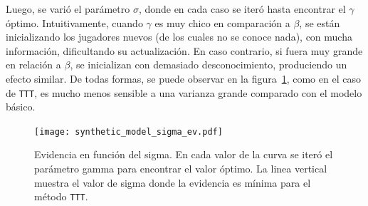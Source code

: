 \documentclass[11pt,twoside, spanish]{report} %
\begin{document}
\begin{table}[H]
\centering
{}
\caption{Tabla de valores para los par\'ametros del modelo para el caso de tres habilidades iniciales diferentes. En estos casos, $\beta$ es 1, el $\sigma$ inicial es 3 y el $\gamma$ $1e-07$.}
\label{tab:mu}
\end{table}


Luego, se vari\'o el par\'ametro $\sigma$, donde en cada caso se iter\'o hasta encontrar el $\gamma$ \'optimo.
Intuitivamente, cuando $\gamma$ es muy chico en comparaci\'on a $\beta$, se est\'an inicializando los jugadores nuevos (de los cuales no se conoce nada), con mucha informaci\'on, dificultando su actualizaci\'on.
En caso contrario, si fuera muy grande en relaci\'on a $\beta$, se inicializan con demasiado desconocimiento, produciendo un efecto similar.
De todas formas, se puede observar en la figura~\ref{fig:sigma_ev}, como en el caso de \texttt{TTT}, es mucho menos sensible a una varianza grande comparado con el modelo b\'asico.

\begin{figure}[H]
	\centering
	\texttt{[image: synthetic\_model\_sigma\_ev.pdf]}
	\caption{Evidencia en funci\'on del sigma. En cada valor de la curva se iter\'o el par\'ametro gamma para encontrar el valor \'optimo. La linea vertical muestra el valor de sigma donde la evidencia es m\'inima para el m\'etodo \texttt{TTT}.}
	\label{fig:sigma_ev}
\end{figure}
\end{document}
